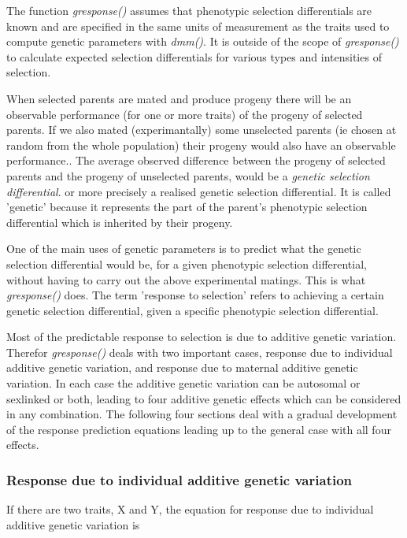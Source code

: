 \documentclass[titlepage]{article}  %
\begin{document}
The function {\em gresponse()} assumes that phenotypic selection differentials are known and are specified in the same units of measurement as the traits used to compute genetic parameters with {\em dmm()}. It is outside of the scope of {\em gresponse()} to calculate expected selection differentials for various types and intensities of selection.

When selected parents are mated and produce progeny there will be an observable performance (for one or more traits) of the progeny of selected parents. If we also mated (experimantally) some unselected parents (ie chosen at random from the whole population) their progeny would also have an observable performance.. The average observed difference between the progeny of selected parents and the progeny of unselected parents, would be a {\em genetic selection differential}. or more precisely a realised genetic selection differential. It is called 'genetic' because it represents the part of the parent's phenotypic selection differential which is inherited by their progeny.

One of the main uses of genetic parameters is to predict what the genetic selection differential would be, for a given phenotypic selection differential, without having to carry out the above experimental matings. This is what {\em gresponse()} does. The term 'response to selection' refers to achieving a certain genetic selection differential, given a specific phenotypic selection differential.

Most of the predictable response to selection is due to additive genetic variation. Therefor {\em gresponse()} deals with two important cases, response due to individual additive genetic variation, and response due to maternal additive genetic variation.   In each case the additive genetic variation can be autosomal or sexlinked or both, leading to four additive genetic effects which can be considered in any combination. The following four sections deal with a gradual development of the response prediction equations leading up to the general case with all four effects.

\subsubsection{Response due to individual additive genetic variation}
If there are two traits, X and Y, the equation for response due to individual additive genetic variation is
\end{document}
